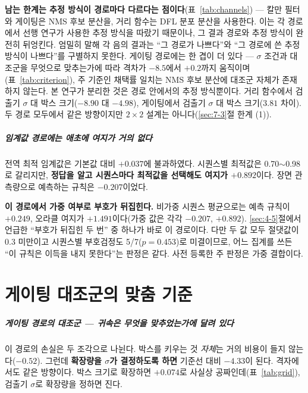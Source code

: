 \documentclass[12pt,a4paper,oneside]{report}
\begin{document}
\textbf{남는 한계는 추정 방식이 경로마다 다르다는 점이다}(표~\ref{tab:channels}) --- 칼만 필터와 게이팅은 NMS 후보 분산을, 거리 함수는 DFL 분포 분산을 사용한다. 이는 각 경로에서 선행 연구가 사용한 추정 방식을 따랐기 때문이나, 그 결과 경로와 추정 방식이 완전히 뒤엉킨다. 엄밀히 말해 각 음의 결과는 ``그 경로가 나쁘다''와 ``그 경로에 쓴 추정 방식이 나쁘다''를 구별하지 못한다. 게이팅 경로에는 한 겹이 더 있다 --- $\sigma$ 조건과 대조군을 무엇으로 맞추는가에 따라 격차가 $-8.5$에서 $+0.2$까지 움직이며(표~\ref{tab:criterion}), 주 기준인 채택률 일치는 NMS 후보 분산에 대조군 자체가 존재하지 않는다. 본 연구가 분리한 것은 경로 안에서의 추정 방식뿐이다. 거리 함수에서 검출기 $\sigma$ 대 박스 크기($-8.90$ 대 $-4.98$), 게이팅에서 검출기 $\sigma$ 대 박스 크기($3.81$ 차이). 두 경로 모두에서 같은 방향이지만 $2 \times 2$ 설계는 아니다(\ref{sec:7-3}절 한계 (1)).

\paragraph{임계값 경로에는 애초에 여지가 거의 없다} 전역 최적 임계값은 기본값 대비 $+0.037$에 불과하였다. 시퀀스별 최적값은 0.70$\sim$0.98로 갈리지만, \textbf{정답을 알고 시퀀스마다 최적값을 선택해도 여지가 $+0.892$}이다. 장면 관측량으로 예측하는 규칙은 $-0.207$이었다.

\textbf{이 경로에서 가중 여부로 부호가 뒤집힌다.} 비가중 시퀀스 평균으로는 예측 규칙이 $+0.249$, 오라클 여지가 $+1.491$이다(가중 값은 각각 $-0.207$, $+0.892$). \ref{sec:4-5}절에서 언급한 ``부호가 뒤집힌 두 번'' 중 하나가 바로 이 경로이다. 다만 두 값 모두 절댓값이 $0.3$ 미만이고 시퀀스별 부호검정도 5/7($p = 0.453$)로 미결이므로, 어느 집계를 쓰든 ``이 규칙은 이득을 내지 못한다''는 판정은 같다. 사전 등록한 주 판정은 가중 결합이다.

\chapter{게이팅 대조군의 맞춤 기준}\label{app:criterion}

\paragraph{게이팅 경로의 대조군 --- 귀속은 무엇을 맞추었는가에 달려 있다} 이 경로의 손실은 두 조각으로 나뉜다. 박스를 키우는 것 \textit{자체}는 거의 비용이 들지 않는다($-0.52$). 그런데 \textbf{확장량을 $\sigma$가 결정하도록 하면} 기준선 대비 $-4.33$이 된다. 격자에서도 같은 방향이다. 박스 크기로 확장하면 $+0.074$로 사실상 공짜인데(표~\ref{tab:grid}), 검출기 $\sigma$로 확장량을 정하면 진다.
\end{document}
